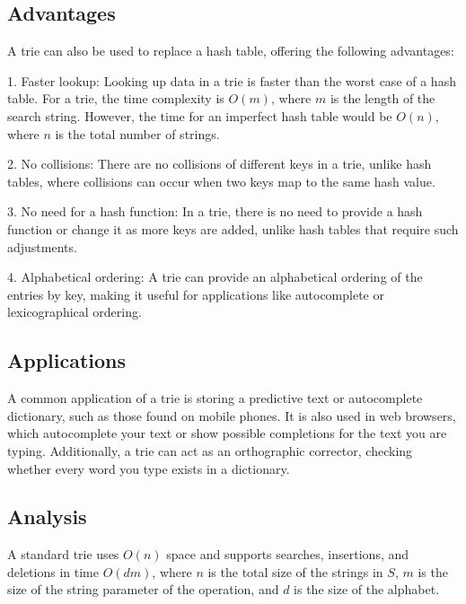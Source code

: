 \subsection{Advantages}
A trie can also be used to replace a hash table, offering the following advantages:

1. Faster lookup: Looking up data in a trie is faster than the worst case of a hash table. For a trie, the time complexity is \(O(m)\), where \(m\) is the length of the search string. However, the time for an imperfect hash table would be \(O(n)\), where \(n\) is the total number of strings.

2. No collisions: There are no collisions of different keys in a trie, unlike hash tables, where collisions can occur when two keys map to the same hash value.

3. No need for a hash function: In a trie, there is no need to provide a hash function or change it as more keys are added, unlike hash tables that require such adjustments.

4. Alphabetical ordering: A trie can provide an alphabetical ordering of the entries by key, making it useful for applications like autocomplete or lexicographical ordering.

\subsection{Applications}
A common application of a trie is storing a predictive text or autocomplete dictionary, such as those found on mobile phones. It is also used in web browsers, which autocomplete your text or show possible completions for the text you are typing. Additionally, a trie can act as an orthographic corrector, checking whether every word you type exists in a dictionary.

\subsection{Analysis}
A standard trie uses \(O(n)\) space and supports searches, insertions, and deletions in time \(O(dm)\), where \(n\) is the total size of the strings in \(S\), \(m\) is the size of the string parameter of the operation, and \(d\) is the size of the alphabet.
